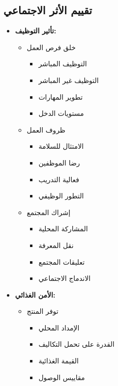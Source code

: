 \subsection{تقييم الأثر الاجتماعي}
\begin{itemize}
    \item \textbf{تأثير التوظيف:}
    \begin{itemize}
        \item خلق فرص العمل
        \begin{itemize}
            \item التوظيف المباشر
            \item التوظيف غير المباشر
            \item تطوير المهارات
            \item مستويات الدخل
        \end{itemize}
        
        \item ظروف العمل
        \begin{itemize}
            \item الامتثال للسلامة
            \item رضا الموظفين
            \item فعالية التدريب
            \item التطور الوظيفي
        \end{itemize}
        
        \item إشراك المجتمع
        \begin{itemize}
            \item المشاركة المحلية
            \item نقل المعرفة
            \item تعليقات المجتمع
            \item الاندماج الاجتماعي
        \end{itemize}
    \end{itemize}
    
    \item \textbf{الأمن الغذائي:}
    \begin{itemize}
        \item توفر المنتج
        \begin{itemize}
            \item الإمداد المحلي
            \item القدرة على تحمل التكاليف
            \item القيمة الغذائية
            \item مقاييس الوصول
        \end{itemize}
        

\end{itemize}
\end{itemize}
